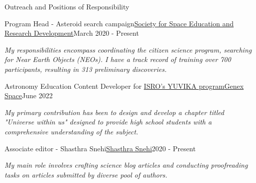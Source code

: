 \begin{section}{Outreach and Positions of Responsibility}

    \begin{subsectionnobullet}{Program Head - Asteroid search campaign}{\href{https://www.sserd.org/asteroidhunt/}{Society for Space Education and Research Development}}{March 2020 - Present}{}
        \item \textit{{My responsibilities encompass coordinating the citizen science program, searching for Near Earth Objects (NEOs). I have a track record of training over 700 participants, resulting in 313 preliminary discoveries.}}
    \end{subsectionnobullet}
  \vspace{-0.2em}  
    \begin{subsectionnobullet}{Astronomy Education Content Developer for \href{https://www.isro.gov.in/YUVIKA.html}{ISRO's YUVIKA program}}{\href{https://genex.space/}{Genex Space}}{June 2022}{}
        \item \textit{{My primary contribution has been to design and develop a chapter titled "Universe within us" designed to provide high school students with a comprehensive understanding of the subject.}}
    \end{subsectionnobullet} 
    \vspace{-0.2em}
    \begin{subsectionnobullet}{Associate editor - Shasthra Snehi}{\href{https://shasthrasnehi.com/}{Shasthra Snehi}}{2020 - Present}{}
    \item \textit{{My main role involves crafting science blog articles and conducting proofreading tasks on articles submitted by diverse pool of authors.}}
    \end{subsectionnobullet}

\end{section}